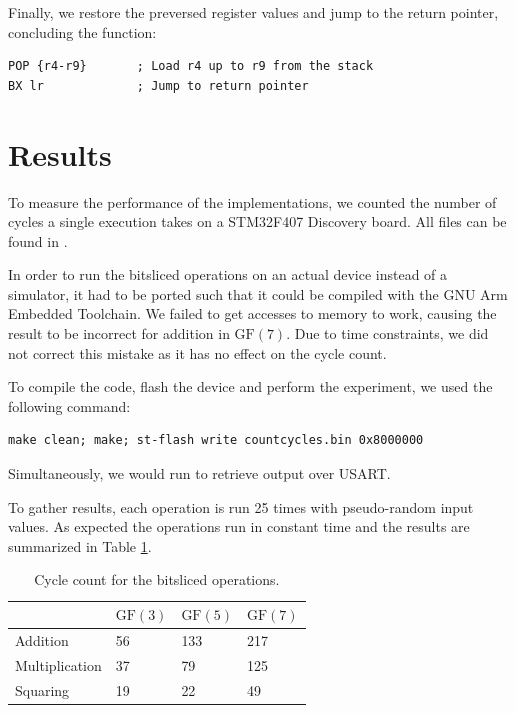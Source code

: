 \documentclass{report}
\newcommand{\GF}{\text{GF}}
\begin{document}
Finally, we restore the preversed register values and jump to the return pointer, concluding the function:
\begin{verbatim}
POP {r4-r9}       ; Load r4 up to r9 from the stack
BX lr             ; Jump to return pointer
\end{verbatim}

\section{Results}
To measure the performance of the implementations, we counted the number of cycles a single execution takes on a STM32F407 Discovery board. All files can be found in .

In order to run the bitsliced operations on an actual device instead of a simulator, it had to be ported such that it could be compiled with the GNU Arm Embedded Toolchain. We failed to get accesses to memory to work, causing the result to be incorrect for addition in $\GF(7)$. Due to time constraints, we did not correct this mistake as it has no effect on the cycle count.

To compile the code, flash the device and perform the experiment, we used the following command:
\begin{verbatim}
make clean; make; st-flash write countcycles.bin 0x8000000
\end{verbatim}
Simultaneously, we would run  to retrieve output over USART.

To gather results, each operation is run 25 times with pseudo-random input values. As expected the operations run in constant time and the results are summarized in Table \ref{fig:cnt}.
\begin{table}[ht]
\centering
\begin{tabular}{l|lll}
               & $\GF(3)$ & $\GF(5)$ & $\GF(7)$ \\ \hline
Addition       & 56    & 133   & 217   \\
Multiplication & 37    & 79    & 125   \\
Squaring       & 19    & 22    & 49   
\end{tabular}
\caption{Cycle count for the bitsliced operations.}
\label{fig:cnt}
\end{table}
\end{document}
